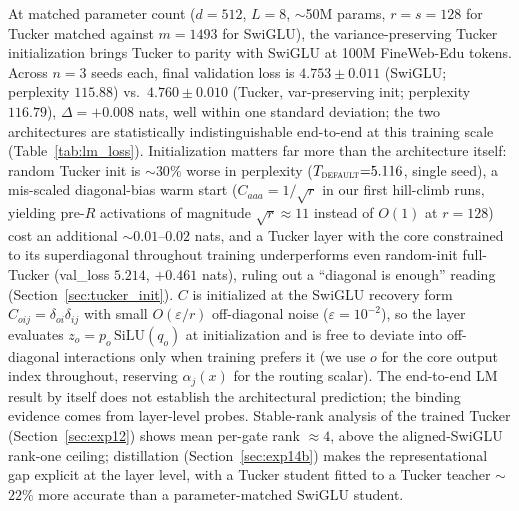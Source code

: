 \iftrue
At matched parameter count ($d{=}512$, $L{=}8$, $\sim$50M params,
$r{=}s{=}128$ for Tucker matched against $m{=}1493$ for SwiGLU), the
variance-preserving Tucker initialization brings Tucker to parity with
SwiGLU at 100M FineWeb-Edu tokens. Across $n{=}3$ seeds each, final
validation loss is $4.753 \pm 0.011$ (SwiGLU; perplexity $115.88$) vs.\
$4.760 \pm 0.010$ (Tucker, var-preserving init; perplexity $116.79$),
$\Delta{=}{+}0.008$ nats, well within one standard deviation; the two
architectures are statistically indistinguishable end-to-end at this
training scale (Table~\ref{tab:lm_loss}). Initialization matters far
more than the architecture itself: random Tucker init is $\sim$$30\%$
worse in perplexity ($T_{\textsc{default}}{=}5.116$, single seed), a
mis-scaled diagonal-bias warm start ($C_{aaa}{=}1/\sqrt{r}$ in our first
hill-climb runs, yielding pre-$R$ activations of magnitude
$\sqrt{r}{\approx}11$ instead of $O(1)$ at $r{=}128$) cost an additional
$\sim$$0.01$--$0.02$ nats, and a Tucker layer with the core constrained
to its superdiagonal throughout training underperforms even random-init
full-Tucker (val\_loss $5.214$, $+0.461$ nats), ruling out a ``diagonal
is enough'' reading (Section~\ref{sec:tucker_init}). $C$ is initialized
at the SwiGLU recovery form $C_{oij}{=}\delta_{oi}\delta_{ij}$ with
small $O(\varepsilon/r)$ off-diagonal noise ($\varepsilon{=}10^{-2}$),
so the layer evaluates $z_o{=}p_o\,\mathrm{SiLU}(q_o)$ at initialization
and is free to deviate into off-diagonal interactions only when training
prefers it (we use $o$ for the core output index throughout, reserving
$\alpha_j(x)$ for the routing scalar). The end-to-end LM result by
itself does not establish the architectural prediction; the binding
evidence comes from layer-level probes. Stable-rank analysis of the
trained Tucker (Section~\ref{sec:exp12}) shows mean per-gate rank
$\approx$$4$, above the aligned-SwiGLU rank-one ceiling; distillation
(Section~\ref{sec:exp14b}) makes the representational gap explicit at
the layer level, with a Tucker student fitted to a Tucker teacher
$\sim$$22\%$ more accurate than a parameter-matched SwiGLU student.
\fi

